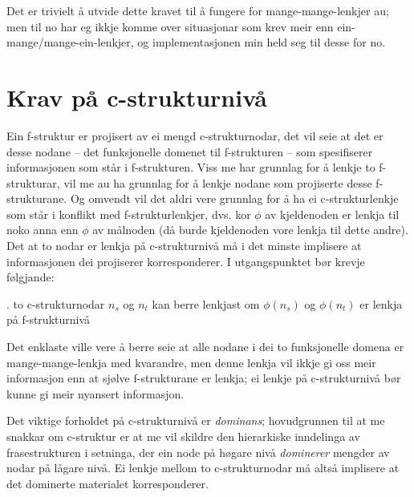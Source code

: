 \documentclass[11pt,a4paper,oneside,draft]{book}
\begin{document}
Det er trivielt å utvide dette kravet til å fungere for
mange-mange-lenkjer au; men til no har eg ikkje komme over situasjonar
som krev meir enn ein-mange/mange-ein-lenkjer, og implementasjonen min
held seg til desse for no.

\section{Krav på c-strukturnivå}
\label{sec-3.7}

\label{SEC:subnode}

Ein f-struktur er projisert av ei mengd c-strukturnodar, det vil seie
at det er desse nodane -- det funksjonelle domenet til f-strukturen --
som spesifiserer informasjonen som står i f-strukturen. Viss me har
grunnlag for å lenkje to f-strukturar, vil me au ha grunnlag for å
lenkje nodane som projiserte desse f-strukturane. Og omvendt vil det
aldri vere grunnlag for å ha ei c-strukturlenkje som står i konflikt
med f-strukturlenkjer, dvs. kor $\phi$ av kjeldenoden er lenkja til
noko anna enn $\phi$ av målnoden (då burde kjeldenoden vore lenkja til
dette andre). Det at to nodar er lenkja på c-strukturnivå må i det
minste implisere at informasjonen dei projiserer korresponderer. I
utgangspunktet bør krevje følgjande:

\ex.\label{krav:subnode-f-lenkja} to c-strukturnodar $n_s$ og $n_t$ kan
     berre lenkjast om $\phi(n_s)$ og $\phi(n_t)$ er lenkja på
     f-strukturnivå

Det enklaste ville vere å berre seie at alle nodane i dei to
funksjonelle domena er mange-mange-lenkja med kvarandre, men denne
lenkja vil ikkje gi oss meir informasjon enn at sjølve f-strukturane
er lenkja; ei lenkje på c-strukturnivå bør kunne gi meir nyansert
informasjon.

Det viktige forholdet på c-strukturnivå er \emph{dominans}; hovudgrunnen
til at me snakkar om c-struktur er at me vil skildre den hierarkiske
inndelinga av frasestrukturen i setninga, der ein node på høgare nivå
\emph{dominerer} mengder av nodar på lågare nivå. Ei lenkje mellom to
c-strukturnodar må altså implisere at det dominerte materialet
korresponderer.
\end{document}

